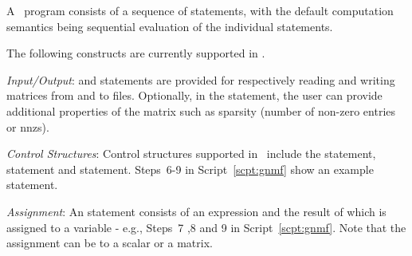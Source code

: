  A \dmlr\ program consists of a sequence of statements, with 
the default computation semantics being sequential evaluation of the individual 
statements. 

The following constructs are currently supported in \dmlr.

{\it Input/Output}:  and 
statements are provided for respectively reading and writing matrices from and to files. 
Optionally, in the  statement,
the user can provide additional properties of the matrix
such as sparsity (number of non-zero entries or nnzs).

{\it Control Structures}: Control structures supported in \dmlr\
include the  statement,  statement and
\concept{if} statement. Steps~6-9 in Script~\ref{scpt:gnmf} show an
example \concept{while} statement.

{\it Assignment}: An  statement 
consists of an expression and the result of which is assigned to a
variable - e.g., Steps~7 ,8 and 9 in Script~\ref{scpt:gnmf}. Note
that the assignment can be to a scalar or a matrix. 

%
%


